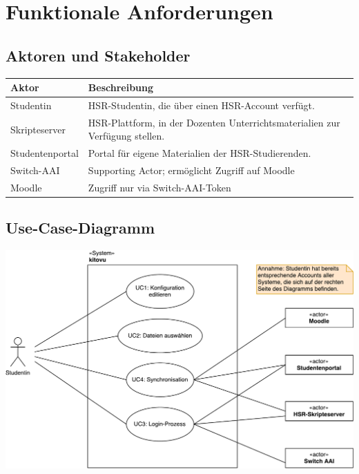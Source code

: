 \documentclass[a4paper]{article}
\let\oldsection\section
\renewcommand\section{\clearpage\oldsection}
\begin{document}
\pagebreak
\section{Funktionale Anforderungen}

\subsection{Aktoren und Stakeholder}

\begin{tabulary}{\linewidth}{lL}
	\toprule
	Aktor & Beschreibung\\
	\midrule
	Studentin & HSR-Studentin, die über einen HSR-Account verfügt.\\
	Skripteserver & HSR-Plattform, in der Dozenten Unterrichtsmaterialien zur Verfügung stellen.\\
	Studentenportal & Portal für eigene Materialien der HSR-Studierenden.\\
	Switch-AAI & Supporting Actor; ermöglicht Zugriff auf Moodle \\	
	Moodle & Zugriff nur via Switch-AAI-Token\\
	
	\bottomrule
\end{tabulary}

\subsection{Use-Case-Diagramm}


\includegraphics[width=40em]{./img/uc_diagram_kitovu.pdf}
\end{document}
